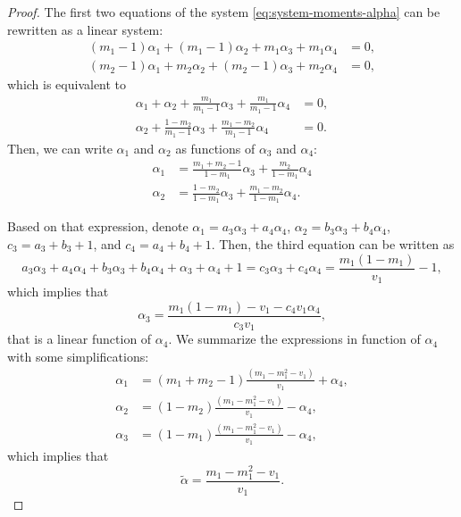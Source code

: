 \begin{proof}
  The first two equations of the system \eqref{eq:system-moments-alpha} can be
rewritten as a linear system:
\begin{align*}
  (m_1 - 1)\alpha_1 + (m_1 - 1)\alpha_2 + m_1\alpha_3 + m_1\alpha_4 &= 0, \\
  (m_2 - 1)\alpha_1 + m_2\alpha_2 + (m_2-1)\alpha_3 + m_2\alpha_4 &= 0,   
\end{align*}
which is equivalent to 
\begin{align*}
  \alpha_1 + \alpha_2 + \frac{m_1}{m_1-1}\alpha_3 + \frac{m_1}{m_1-1}\alpha_4 &= 0, \\
  \alpha_2 + \frac{1-m_2}{m_1-1}\alpha_3 + \frac{m_1-m_2}{m_1-1}\alpha_4 &= 0.
\end{align*}
Then, we can write $\alpha_1$ and $\alpha_2$ as functions of $\alpha_3$ and
$\alpha_4$:
\begin{align}
  \label{eq:alpha1-as-function-alpha3-alpha4}
  \alpha_1 &= \frac{m_1+m_2-1}{1-m_1}\alpha_3 + \frac{m_2}{1-m_1}\alpha_4 \\
  \label{eq:alpha2-as-function-alpha3-alpha4}
  \alpha_2 &= \frac{1-m_2}{1-m_1}\alpha_3 + \frac{m_1-m_2}{1-m_1}\alpha_4.
\end{align}

Based on that expression, denote $\alpha_1 = a_3\alpha_3 + a_4\alpha_4$, $\alpha_2
= b_3\alpha_3 + b_4\alpha_4$, $c_3 = a_3 + b_3 + 1$, and $c_4 = a_4 + b_4 + 1$. Then, the third equation can be written as 
$$
a_3\alpha_3 + a_4\alpha_4 + b_3\alpha_3 + b_4\alpha_4 + \alpha_3 + \alpha_4 + 1 = c_3\alpha_3 + c_4 \alpha_4 = \frac{m_1(1-m_1)}{v_1} - 1, 
$$
which implies that 
$$
\alpha_3 = \frac{m_1(1-m_1) - v_1 - c_4v_1\alpha_4}{c_3v_1},
$$
that is a linear function of $\alpha_4$. We summarize the expressions in function of $\alpha_4$ with some simplifications: 
\begin{align*}
  \alpha_1 &= (m_1 + m_2 - 1)\frac{(m_1 - m_1^2 - v_1)}{v_1} + \alpha_4, \\
  \alpha_2 &=  (1 - m_2)\frac{(m_1 - m_1^2 - v_1)}{v_1} - \alpha_4, \\
  \alpha_3 &= (1-m_1)\frac{(m_1 - m_1^2 - v_1)}{v_1} - \alpha_4,
\end{align*}
which implies that 
$$
\tilde{\alpha} = \frac{m_1 - m_1^2 - v_1}{v_1}.
$$


\end{proof}
